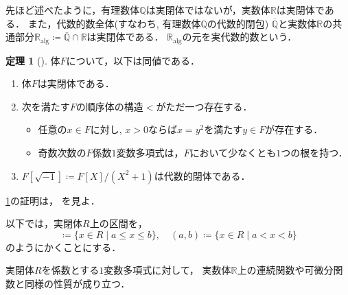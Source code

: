 \documentclass[uplatex, dvipdfmx]{jsarticle}
\numberwithin{equation}{section}
\newcommand{\R}{\mathbb{R}}
\newcommand{\Q}{\mathbb{Q}}
\newcommand{\Ralg}{\mathbb{R}_\mathrm{alg}}
\theoremstyle{definition}
\newtheorem{theorem}[definition]{定理}
\begin{document}
先ほど述べたように，有理数体$\Q$は実閉体ではないが，実数体$\R$は実閉体である．
また，代数的数全体(すなわち, 有理数体$\Q$の代数的閉包) $\overline{\Q}$と実数体$\R$の共通部分$\Ralg \coloneqq \overline{\Q} \cap \R$は実閉体である．
$\Ralg$の元を実代数的数という．

\begin{theorem}[{\cite[S\"{a}tze 1--3]{MR3069467}}] \label{theorem:real-closed-field}
     体$F$について，以下は同値である．
     \begin{enumerate}
          \item 体$F$は実閉体である．
          \item 次を満たす$F$の順序体の構造$<$がただ一つ存在する．
               \begin{itemize}
                    \item 任意の$x \in F$に対し, $x>0$ならば$x = y^2$を満たす$y \in F$が存在する．
                    \item 奇数次数の$F$係数$1$変数多項式は，$F$において少なくとも$1$つの根を持つ．
               \end{itemize}
          \item $F\left[\sqrt{-1}\right] \coloneqq F[X]/(X^2 + 1)$は代数的閉体である．
     \end{enumerate}
\end{theorem}

\cref{theorem:real-closed-field}の証明は，
\cite[Theorem 1.2.2]{MR1659509}を見よ．

以下では，実閉体$R$上の区間を，
\begin{equation}
     [a,b]\coloneqq\{x \in R \mid a \leq x \leq b\}, \quad (a,b)\coloneqq\{x \in R \mid a < x < b\}
\end{equation}
のようにかくことにする．

実閉体$R$を係数とする$1$変数多項式に対して，
実数体$\R$上の連続関数や可微分関数と同様の性質が成り立つ．
\end{document}
